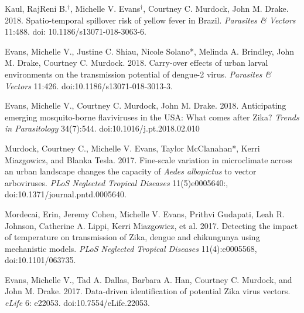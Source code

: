 \begin{etaremune}
\item Kaul, RajReni B.$^\dagger$, \textcolor{awesome}{Michelle V. Evans}$^\dagger$, Courtney C. Murdock, John M. Drake. 2018. Spatio-temporal spillover risk of yellow fever in Brazil. \textit{Parasites \& Vectors} 11:488. doi: 10.1186/s13071-018-3063-6.
\smallskip

\item \textcolor{awesome}{Evans, Michelle V.}, Justine C. Shiau, Nicole Solano*, Melinda A. Brindley, John M. Drake, Courtney C. Murdock. 2018. Carry-over effects of urban larval environments on the transmission potential of dengue-2 virus. \textit{Parasites \& Vectors} 11:426. doi:10.1186/s13071-018-3013-3.

\item \textcolor{awesome}{Evans, Michelle V.}, Courtney C. Murdock, John M. Drake. 2018. Anticipating emerging mosquito-borne flaviviruses in the USA: What comes after Zika? \textit{Trends in Parasitology} 34(7):544. \linebreak doi:10.1016/j.pt.2018.02.010

\item Murdock, Courtney C., \textcolor{awesome}{Michelle V. Evans}, Taylor McClanahan*, Kerri Miazgowicz, and Blanka Tesla. 2017. Fine-scale variation in microclimate across an urban landscape changes the capacity of \textit{Aedes albopictus} to vector arboviruses. \textit{PLoS Neglected Tropical Diseases} 11(5)e0005640:, \linebreak doi:10.1371/journal.pntd.0005640.
\smallskip

\item Mordecai, Erin, Jeremy Cohen, \textcolor{awesome}{Michelle V. Evans}, Prithvi Gudapati, Leah R. Johnson, Catherine A. Lippi, Kerri Miazgowicz, et al. 2017. Detecting the impact of temperature on transmission of Zika, dengue and chikungunya using mechanistic models. \textit{PLoS Neglected Tropical Diseases} 11(4):e0005568, \linebreak doi:10.1101/063735.
\smallskip

\item \textcolor{awesome}{Evans, Michelle V.}, Tad A. Dallas, Barbara A. Han, Courtney C. Murdock, and John M. Drake. 2017. Data-driven identification of potential Zika virus vectors. \textit{eLife} 6: e22053. doi:10.7554/eLife.22053.
\end{etaremune}

\bigskip
